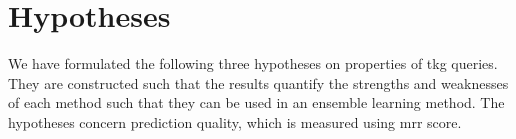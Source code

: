 \section{Hypotheses}
\label{sec:hypotheses}

We have formulated the following three hypotheses on properties of \gls{tkg} queries.
They are constructed such that the results quantify the strengths and weaknesses of each method such that they can be used in an ensemble learning method.
The hypotheses concern prediction quality, which is measured using \gls{mrr} score.



